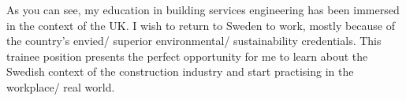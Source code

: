 \documentclass[11pt,a4paper,sans]{moderncv}        %
\begin{document}
As you can see, my education in building services engineering has been immersed in the context of the UK.
I wish to return to Sweden to work, mostly because of the country's envied/ superior environmental/ sustainability credentials.
This trainee position presents the perfect opportunity for me to learn about the Swedish context of the construction industry and start practising in the workplace/ real world.






\end{document}
